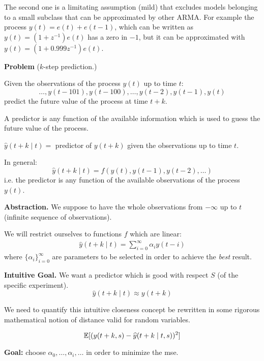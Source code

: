 The second one is a limitating assumption (mild) that excludes models belonging to a small subclass that can be approximated by other ARMA. For example the process $y(t)=e(t)+e(t-1)$, which can be written as $y(t)=(1+z^{-1})e(t)$ has a zero in $-1$, but it can be approximated with $y(t)=(1+0.999z^{-1})e(t)$.

\textbf{Problem} ($k$-step prediction.)

Given the observations of the process $y(t)$ up to time $t$:
$$
	\ldots , y(t-101), y(t-100), \ldots , y(t-2), y(t-1), y(t)
$$
predict the future value of the process at time $t + k$.


A predictor is any function of the available information which is used to guess the future value of the process.

$\hat{y}(t + k \mid t) =$ predictor of $y(t + k)$ given the observations up to time $t$.

In general: 
$$\hat{y}(t + k \mid t) = f ( y(t), y(t-1), y(t-2),\ldots)$$
i.e. the predictor is any function of the available observations of the process $y(t)$.

\textbf{Abstraction.} We suppose to have the whole observations from $-\infty$ up to $t$ (infinite sequence of observations).

We will restrict ourselves to functions $f$ which are linear:
\begin{align*}
	\hat{y}(t + k \mid t)=\sum_{i=0}^{\infty}\alpha_i y(t-i)
\end{align*}
where ${\{\alpha_i\}}_{i=0}^\infty$ are parameters to be selected in order to achieve the \emph{best} result.

\textbf{Intuitive Goal.} 
We want a predictor which is good with respect $S$ (of the specific experiment).
\[
	\hat{y}(t + k \mid t)\approx y(t+k)
\]

We need to quantify this intuitive closeness concept be rewritten in some rigorous mathematical notion of distance valid for random variables.

\begin{definition}
	\[
		\mathbb{E}[(y(t+k,s)-\widehat{y}(t+k\mid t,s))^2]
	\]
\end{definition}

\textbf{Goal:} choose $\alpha_0,\ldots,\alpha_i,\ldots$ in order to minimize the \gls{mse}.